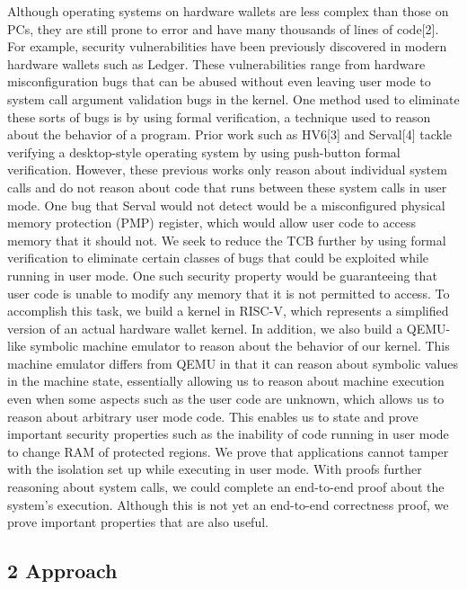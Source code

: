 \documentclass[]{article}
\begin{document}
Although operating systems on hardware wallets are less complex than
those on PCs, they are still prone to error and have many thousands of
lines of code{[}2{]}. For example, security vulnerabilities have been
previously discovered in modern hardware wallets such as Ledger. These
vulnerabilities range from hardware misconfiguration bugs that can be
abused without even leaving user mode to system call argument validation
bugs in the kernel. One method used to eliminate these sorts of bugs is
by using formal verification, a technique used to reason about the
behavior of a program. Prior work such as HV6{[}3{]} and Serval{[}4{]}
tackle verifying a desktop-style operating system by using push-button
formal verification. However, these previous works only reason about
individual system calls and do not reason about code that runs between
these system calls in user mode. One bug that Serval would not detect
would be a misconfigured physical memory protection (PMP) register,
which would allow user code to access memory that it should not. We seek
to reduce the TCB further by using formal verification to eliminate
certain classes of bugs that could be exploited while running in user
mode. One such security property would be guaranteeing that user code is
unable to modify any memory that it is not permitted to access. To
accomplish this task, we build a kernel in RISC-V, which represents a
simplified version of an actual hardware wallet kernel. In addition, we
also build a QEMU-like symbolic machine emulator to reason about the
behavior of our kernel. This machine emulator differs from QEMU in that
it can reason about symbolic values in the machine state, essentially
allowing us to reason about machine execution even when some aspects
such as the user code are unknown, which allows us to reason about
arbitrary user mode code. This enables us to state and prove important
security properties such as the inability of code running in user mode
to change RAM of protected regions. We prove that applications cannot
tamper with the isolation set up while executing in user mode. With
proofs further reasoning about system calls, we could complete an
end-to-end proof about the system's execution. Although this is not yet
an end-to-end correctness proof, we prove important properties that are
also useful.

\subsection{2 Approach}\label{approach}
\end{document}

